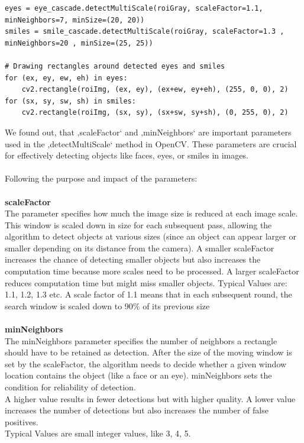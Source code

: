 \documentclass[11pt, a4paper, twocolumn]{article}
\begin{document}
\begin{lstlisting}
eyes = eye_cascade.detectMultiScale(roiGray, scaleFactor=1.1, minNeighbors=7, minSize=(20, 20)) 
smiles = smile_cascade.detectMultiScale(roiGray, scaleFactor=1.3 , minNeighbors=20 , minSize=(25, 25))

# Drawing rectangles around detected eyes and smiles
for (ex, ey, ew, eh) in eyes:
    cv2.rectangle(roiImg, (ex, ey), (ex+ew, ey+eh), (255, 0, 0), 2)
for (sx, sy, sw, sh) in smiles:
    cv2.rectangle(roiImg, (sx, sy), (sx+sw, sy+sh), (0, 255, 0), 2)
\end{lstlisting}
%
We found out, that ‚scaleFactor‘ and ‚minNeighbors‘ are important parameters used in the ‚detectMultiScale‘ method in OpenCV. These parameters are crucial for effectively detecting objects like faces, eyes, or smiles in images. \\\\
Following the purpose and impact of the parameters:\\\\
\textbf{scaleFactor}\\
The parameter specifies how much the image size is reduced at each image scale. This window is scaled down in size for each subsequent pass, allowing the algorithm to detect objects at various sizes (since an object can appear larger or smaller depending on its distance from the camera).
A smaller scaleFactor increases the chance of detecting smaller objects but also increases the computation time because more scales need to be processed. A larger scaleFactor reduces computation time but might miss smaller objects.
Typical Values are: 1.1, 1.2, 1.3 etc. 
A scale factor of 1.1 means that in each subsequent round, the search window is scaled down to 90\% of its previous size\\\\
\textbf{minNeighbors}\\
The minNeighbors parameter specifies the number of neighbors a rectangle should have to be retained as detection. After the size of the moving window is set by the scaleFactor, the algorithm needs to decide whether a given window location contains the object (like a face or an eye). minNeighbors sets the condition for reliability of detection.\\
A higher value results in fewer detections but with higher quality. A lower value increases the number of detections but also increases the number of false positives. \\
Typical Values are small integer values, like 3, 4, 5.\\\\
\end{document}
